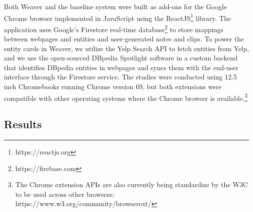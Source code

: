 Both Weaver and the baseline system were built as add-ons for the Google Chrome browser implemented in JavaScript using the ReactJS\footnote{https://reactjs.org} library. The application uses Google's Firestore real-time database\footnote{https://firebase.com} to store mappings between webpages and entities and user-generated notes and clips. To power the entity cards in Weaver, we utilize the Yelp Search API to fetch entities from Yelp, and we use the open-sourced DBpedia Spotlight \cite{spotlight} software in a custom backend that identifies DBpedia entities \cite{dbpedia} in webpages and syncs them with the end-user interface through the Firestore service. The studies were conducted using 12.5 inch Chromebooks running Chrome version 69, but both extensions were compatible with other operating systems where the Chrome browser is available.\footnote{The Chrome extension APIs are also currently being standardize by the W3C to be used across other browsers: https://www.w3.org/community/browserext/}

\subsection{Results}



